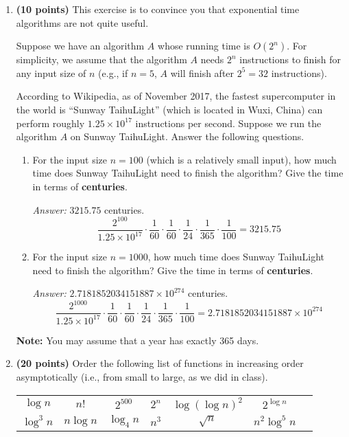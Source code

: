 \documentclass[11pt]{article}
\begin{document}
\begin{enumerate}

\item
{ \bf (10 points)}
This exercise is to convince you that exponential time algorithms are not quite useful.

Suppose we have an algorithm $A$ whose running time is $O(2^{n})$. For simplicity, we assume that the algorithm $A$ needs $2^n$ instructions to finish for any input size of $n$ (e.g., if $n=5$, $A$ will finish after $2^5=32$ instructions).

According to Wikipedia, as of November 2017, the fastest supercomputer in the world is ``Sunway TaihuLight'' (which is located in Wuxi, China) can perform roughly $1.25 \times 10^{17}$ instructions per second.
Suppose we run the algorithm $A$ on Sunway TaihuLight. Answer the following questions.


\begin{enumerate}

\item
For the input size $n=100$ (which is a relatively small input), how much time does Sunway TaihuLight need to finish the algorithm? Give the time in terms of {\bf centuries}.

\textit{Answer:} $3215.75$ centuries.
\[\frac{2^{100}}{1.25 \times 10^{17}} \cdot \frac{1}{60} \cdot \frac{1}{60} \cdot \frac{1}{24} \cdot \frac{1}{365} \cdot \frac{1}{100} = 3215.75\]

\item
For the input size $n=1000$, how much time does Sunway TaihuLight need to finish the algorithm? Give the time in terms of {\bf centuries}.

\textit{Answer:} $2. 718 185 203 415 188 7 \times 10^{274}$ centuries.
\[\frac{2^{1000}}{1.25 \times 10^{17}} \cdot \frac{1}{60} \cdot \frac{1}{60} \cdot \frac{1}{24} \cdot \frac{1}{365} \cdot \frac{1}{100} = 2. 718 185 203 415 188 7 \times 10^{274}\]

\end{enumerate}

{\bf Note:} You may assume that a year has exactly 365 days.

\item
{\bf (20 points)}
Order the following list of functions in increasing order asymptotically (i.e., from small to large, as we did in class).


\begin{table}[h]
\begin{center}
\begin{tabular}{ccccccc}
	$\log n$ & $n!$ & $2^{500}$ &  $2^n$ & $\log(\log n)^2$
					& $2^{\log n}$\\
$\log^3n$  & $n\log n$   &  $\log_4n$   & $n^3$   &
$\sqrt{n}$  & $n^2\log^5 n$  \\
\end{tabular}
\end{center}
\vspace{-0.2in}
\end{table}


\end{enumerate}
\end{document}
